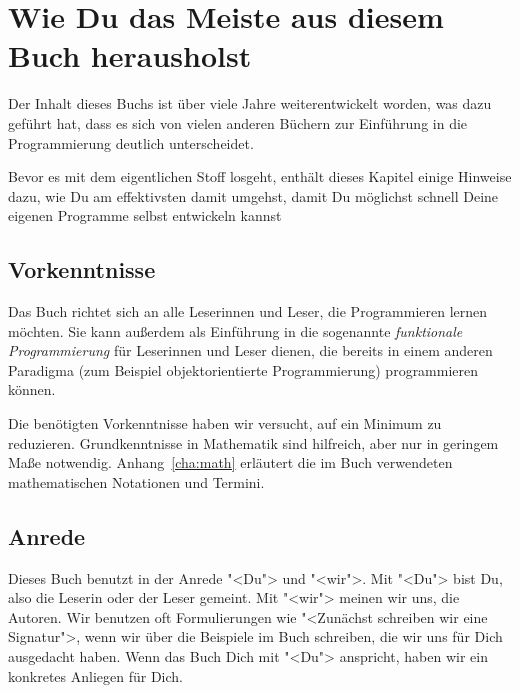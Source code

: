 
\setcounter{chapter}{-1}
\chapter{Wie Du das Meiste aus diesem Buch herausholst}

Der Inhalt dieses Buchs ist über viele Jahre weiterentwickelt worden,
was dazu geführt hat, dass es sich von vielen anderen Büchern zur
Einführung in die Programmierung deutlich unterscheidet.

Bevor es mit dem eigentlichen Stoff losgeht, enthält dieses Kapitel
einige Hinweise dazu, wie Du am effektivsten damit umgehst, damit Du
möglichst schnell Deine eigenen Programme selbst entwickeln kannst

\section{Vorkenntnisse}

Das Buch richtet sich an alle Leserinnen und Leser, die Programmieren
lernen möchten.  Sie kann außerdem als Einführung in die sogenannte
\textit{funktionale Programmierung} für Leserinnen und Leser dienen,
die bereits in einem anderen Paradigma (zum Beispiel objektorientierte
Programmierung) programmieren können.

Die benötigten Vorkenntnisse haben wir versucht, auf ein Minimum zu
reduzieren.  Grundkenntnisse in Mathematik sind hilfreich, aber nur in
geringem Maße notwendig.  Anhang~\ref{cha:math} erläutert die im Buch
verwendeten mathematischen Notationen und Termini.

\section{Anrede}

Dieses Buch benutzt in der Anrede "<Du"> und "<wir">.  Mit "<Du"> bist
Du, also die Leserin oder der Leser gemeint.  Mit "<wir"> meinen wir
uns, die Autoren.  Wir benutzen oft Formulierungen wie "<Zunächst
schreiben wir eine Signatur">, wenn wir über die Beispiele im Buch
schreiben, die wir uns für Dich ausgedacht haben.  Wenn das Buch Dich
mit "<Du"> anspricht, haben wir ein konkretes Anliegen für Dich.

